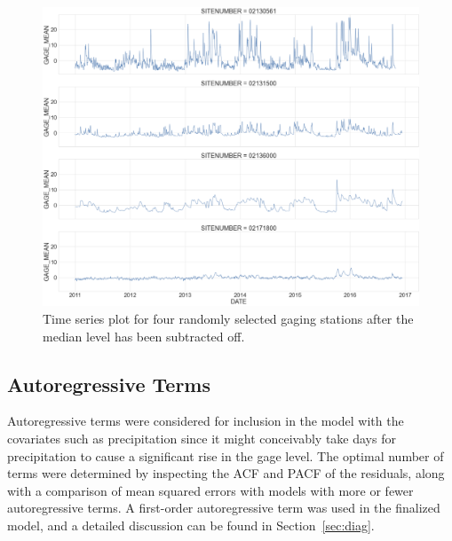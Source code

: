 \documentclass{svjour3}
\renewcommand\hl[1]{#1}
\begin{document}
\begin{figure}[htbp]
 \begin{center}
\includegraphics[width=1\textwidth]{../images/time_series_plots_four_stations.png}
\caption{\hl{Time series plot for four randomly selected gaging stations after the median level has been subtracted off.}}
\label{fig:ts_plot_gage}
 \end{center}
\end{figure}

\subsection{Autoregressive Terms}\label{subsec:autoregressive-terms}
Autoregressive terms were considered for inclusion in the model with the covariates such as precipitation since it might conceivably take days for precipitation to cause a significant rise in the gage level.
The optimal number of terms were determined by inspecting the ACF and PACF of the residuals, along with a comparison of mean squared errors with models with more or fewer autoregressive terms.
A first-order autoregressive term was used in the finalized model, and a detailed discussion can be found in Section~\ref{sec:diag}.
\end{document}
